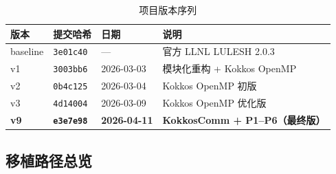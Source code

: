 \documentclass[UTF8,12pt,a4paper]{ctexart}
\begin{document}
\begin{table}[H]
\centering
\caption{项目版本序列}
\label{tab:versions}
\begin{tabular}{llll}
\toprule
\textbf{版本} & \textbf{提交哈希} & \textbf{日期} & \textbf{说明} \\
\midrule
baseline & \texttt{3e01c40} & ---        & 官方 LLNL LULESH 2.0.3 \\
v1       & \texttt{3003bb6} & 2026-03-03 & 模块化重构 + Kokkos OpenMP \\
v2       & \texttt{0b4c125} & 2026-03-04 & Kokkos OpenMP 初版 \\
v3       & \texttt{4d14004} & 2026-03-09 & Kokkos OpenMP 优化版 \\
\textbf{v9} & \textbf{\texttt{e3e7e98}} & \textbf{2026-04-11} & \textbf{KokkosComm + P1--P6（最终版）} \\
\bottomrule
\end{tabular}
\end{table}

\subsection{移植路径总览}
\end{document}
